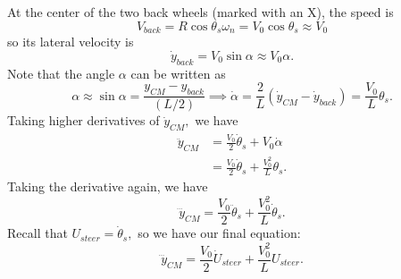 \documentclass{article}
\numberwithin{equation}{section}
\begin{document}
\begin{enumerate}[label=\textbf{1.\arabic*}]
    At the center of the two back wheels (marked with an X), the speed is 
    \begin{equation}
        V_{back} = R\cos\theta_s \omega_n = V_0\cos\theta_s \approx V_0
    \end{equation}
    so its lateral velocity is 
    \begin{equation}
        \dot{y}_{back} = V_0\sin\alpha \approx V_0\alpha.
    \end{equation}
    Note that the angle $\alpha$ can be written as 
    \begin{equation}
        \alpha \approx \sin\alpha = \frac{y_{CM}-y_{back}}{(L/2)}  \implies \dot{\alpha} = \frac{2}{L}\left({\dot{y}_{CM}-\dot{y}_{back}} \right) = \frac{V_0}{L}\theta_s.
    \end{equation}
    Taking higher derivatives of $\dot{y}_{CM},$ we have 
    \begin{align}
        \ddot{y}_{CM} &= \frac{V_0}{2}\dot{\theta}_s + V_0\dot{\alpha} \\
        &= \frac{V_0}{2}\dot{\theta}_s + \frac{V_0^2}{L}\theta_s.
    \end{align}
    Taking the derivative again, we have 
    \begin{equation}
        \dddot{y}_{CM} = \frac{V_0}{2}\ddot{\theta}_s + \frac{V_0^2}{L}\dot{\theta}_s.
    \end{equation}
    Recall that $U_{steer}=\dot{\theta}_s,$ so we have our final equation:
    \begin{equation}
        \boxed{\dddot{y}_{CM} = \frac{V_0}{2}\dot{U}_{steer} + \frac{V_0^2}{L}U_{steer}.}
    \end{equation}

\end{enumerate}
\end{document}
